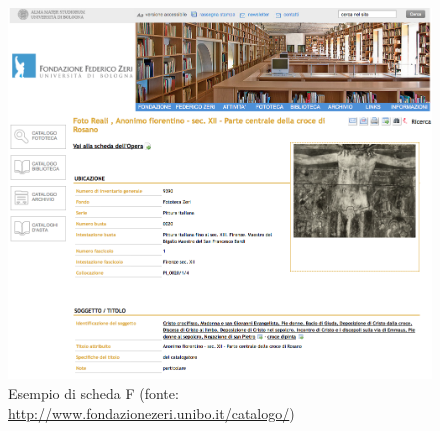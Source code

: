 \begin{figure}[p!]
    \centering
    \includegraphics[width=\textwidth]{images/fondazionezeri-screen.png}
	\caption{Esempio di scheda F (fonte: \protect\url{http://www.fondazionezeri.unibo.it/catalogo/})}
	\label{fig:fondazionezeri-screen}
\end{figure}

